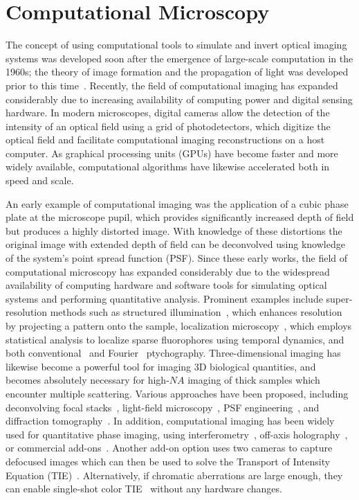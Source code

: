\section{Computational Microscopy}

The concept of using computational tools to simulate and invert optical imaging systems was developed soon after the emergence of large-scale computation in the 1960s; the theory of image formation and the propagation of light was developed prior to this time~\cite{maxwell1890scientific, gernheim1969history}. Recently, the field of computational imaging has expanded considerably due to increasing availability of computing power and digital sensing hardware. In modern microscopes, digital cameras allow the detection of the intensity of an optical field using a grid of photodetectors, which digitize the optical field and facilitate computational imaging reconstructions on a host computer. As graphical processing units (GPUs) have become faster and more widely available, computational algorithms have likewise accelerated both in speed and scale.

An early example of computational imaging was the application of a cubic phase plate at the microscope pupil, which provides significantly increased depth of field but produces a highly distorted image. With knowledge of these distortions the original image with extended depth of field can be deconvolved using knowledge of the system's point spread function (PSF)\cite{Dowski:95}. Since these early works, the field of computational microscopy has expanded considerably due to the widespread availability of computing hardware and software tools for simulating optical systems and performing quantitative analysis. Prominent examples include super-resolution methods such as structured illumination~\cite{gustafsson2000surpassing, gustafsson2005nonlinear}, which enhances resolution by projecting a pattern onto the sample, localization microscopy~\cite{betzig2006imaging, Rust:06}, which employs statistical analysis to localize sparse fluorophores using temporal dynamics, and both conventional~\cite{rodenburg2004phase} and Fourier~\cite{Zheng2013} ptychography. Three-dimensional imaging has likewise become a powerful tool for imaging 3D biological quantities, and becomes absolutely necessary for high-$NA$ imaging of thick samples which encounter multiple scattering. Various approaches have been proposed, including deconvolving focal stacks~\cite{agard1984optical}, light-field microscopy~\cite{broxton2013wave, Ng2005}, PSF engineering~\cite{pavani2008three}, and diffraction tomography~\cite{wolf1969three, kim2014diffraction, maleki1992tomographic}. In addition, computational imaging has been widely used for quantitative phase imaging, using interferometry~\cite{Popescu2006,kim2014diffraction, Bhaduri:12}, off-axis holography~\cite{Witte:12}, or commercial add-ons~\cite{phasics,bon2012method}. Another add-on option uses two cameras to capture defocused images which can then be used to solve the Transport of Intensity Equation (TIE)~\cite{allman2005optical}. Alternatively, if chromatic aberrations are large enough, they can enable single-shot color TIE~\cite{wallerColorTIE} without any hardware changes.

